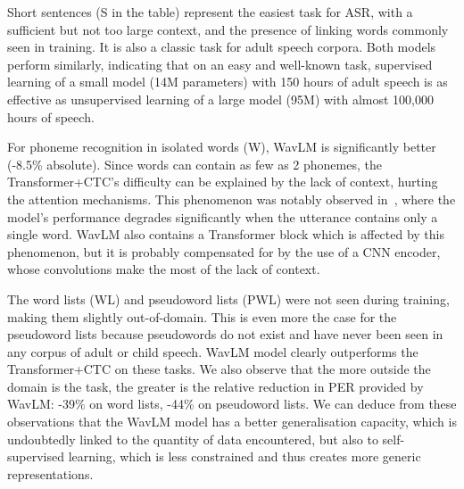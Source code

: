 \documentclass{Interspeech2024}
\begin{document}
\vspace{-0.2cm}
Short sentences (S in the table) represent the easiest task for ASR, with a sufficient but not too large context, and the presence of linking words commonly seen in training. It is also a classic task for adult speech corpora. 
Both models perform similarly, indicating that on an easy and well-known task,
supervised learning of a small model (14M parameters) with 150 hours of adult speech is as effective as unsupervised learning of a large model (95M) with almost 100,000 hours of speech.

For phoneme recognition in isolated words (W), WavLM is significantly better (-8.5\% absolute). Since words can contain as few as 2 phonemes, the Transformer+CTC's difficulty can be explained by the lack of context, hurting the attention mechanisms. This phenomenon was notably observed in~\cite{Chan2015-LAS}, where the model's performance degrades significantly when the utterance contains only a single word. WavLM also contains a Transformer block which is affected by this phenomenon, but it is probably compensated for by the use of a CNN encoder, whose convolutions make the most of the lack of context.

The word lists (WL) and pseudoword lists (PWL) were not seen during training, making them slightly out-of-domain. This is even more the case for the pseudoword lists because pseudowords do not exist and have never been seen in any corpus of adult or child speech. WavLM model clearly outperforms the Transformer+CTC on these tasks. We also observe that the more outside the domain is the task, the greater is the relative reduction in PER provided by WavLM: -39\% on word lists, -44\% on pseudoword lists. We can deduce from these observations that the WavLM model has a better generalisation capacity, which is undoubtedly linked to the quantity of data encountered, but also to self-supervised learning, which is less constrained and thus creates more generic representations.

\end{document}
